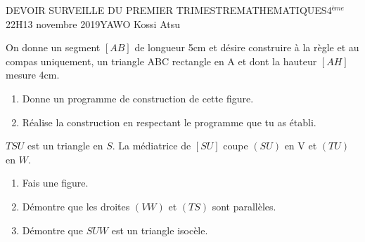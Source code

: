 \documentclass[12pt,a4paper]{book}
\newcommand{\prof}{YAWO Kossi Atsu}
\newcommand{\matiere}{MATHEMATIQUES}
\newcommand{\classe}{4$^{ème}$}
\begin{document}
\begin{devoir}{DEVOIR SURVEILLE DU PREMIER TRIMESTRE}{\matiere}{\classe}{2}{2H}{13 novembre 2019}{\prof}
\begin{exo}[6]
\end{exo}

\vspace{1cm}

\begin{exo}[5]
On donne un segment $[AB]$ de longueur 5cm et désire construire à la règle et au compas uniquement, un triangle ABC rectangle en A et dont la hauteur $[AH]$ mesure 4cm.
\begin{enumerate}
\item Donne un programme de construction de cette figure.
\item Réalise la construction en respectant le programme que tu as établi.
\end{enumerate} 
\end{exo}

\vspace{1cm}

\begin{exo}[5]
$TSU$ est un triangle en $S$. La médiatrice de $[SU]$ coupe $(SU)$ en V et $(TU)$ en $W$. 
\begin{enumerate}
\item Fais une figure.
\item Démontre que les droites $(VW)$ et $(TS)$ sont parallèles.
\item Démontre que $SUW$ est un triangle isocèle.
\end{enumerate}
\end{exo}

\tableofcompetences
\end{devoir}
\end{document}
